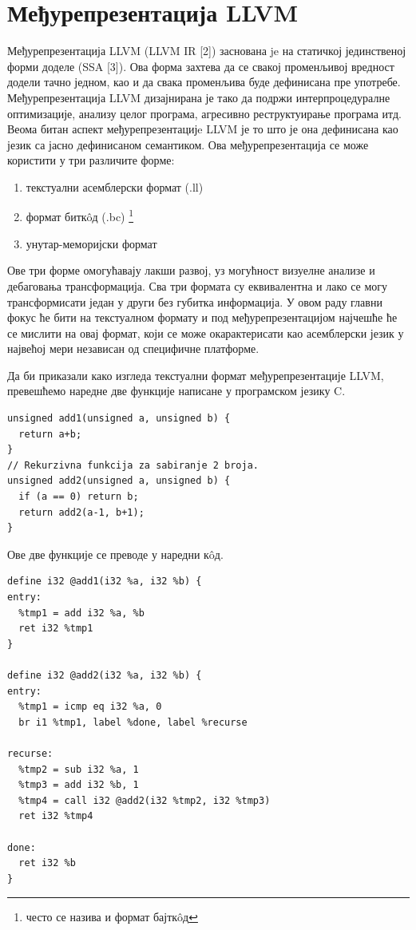 \documentclass[12pt,oneside]{memoir}
\begin{document}
\section{Међурепрезентација LLVM}
Међурепрезентација LLVM (LLVM IR [2]) заснована je на статичкој 
јединственој форми доделе (SSA [3]).
Ова форма захтева да се свакој променљивој вредност додели тачно једном, као и да
свака променљива буде дефинисана пре употребе.
Међурепрезентација LLVM дизајнирана је тако да подржи интерпроцедуралне оптимизације,
анализу целог програма, агресивно реструктуирање програма итд.
Веома битан аспект међурепрезентацијe LLVM је то што је она дефинисана као 
језик са јасно дефинисаном семантиком.
Ова међурепрезентација се може користити у три различите форме: 
\begin{enumerate}
\item текстуални асемблерски формат (.ll)
\item формат битк\^{o}д (.bc) \footnote{често се назива и формат бајтк\^{o}д}
\item унутар-меморијски формат 
\end{enumerate} 
Ове три форме омогућавају лакши развој, уз могућност
визуелне анализе и дебаговања трансформација. 
Сва три формата су еквивалентна и лако се могу трансформисати један у други без
губитка информација. 
У овом раду главни фокус ће бити на текстуалном формату и под међурепрезентацијом
 најчешће ће се мислити на овај формат, који се може окарактерисати као асемблерски 
језик у највећој мери независан од специфичне платформе.

Да би приказали како изгледа текстуални формат међурепрезентације LLVM,
превешћемо наредне две функције написане у програмском језику C.
\begin{lstlisting}[frame=single]
unsigned add1(unsigned a, unsigned b) {
  return a+b;
}
// Rekurzivna funkcija za sabiranje 2 broja.
unsigned add2(unsigned a, unsigned b) {
  if (a == 0) return b;
  return add2(a-1, b+1);
}
\end{lstlisting}
\pagebreak
Ове две функције се преводе у наредни к\^{o}д.
\begin{lstlisting}[frame=single,caption={Kod preuzet sa članka  \textit{LLVM - The archicture of open source applications} [15]}, captionpos=b]
define i32 @add1(i32 %a, i32 %b) {
entry:
  %tmp1 = add i32 %a, %b
  ret i32 %tmp1
}

define i32 @add2(i32 %a, i32 %b) {
entry:
  %tmp1 = icmp eq i32 %a, 0
  br i1 %tmp1, label %done, label %recurse

recurse:
  %tmp2 = sub i32 %a, 1
  %tmp3 = add i32 %b, 1
  %tmp4 = call i32 @add2(i32 %tmp2, i32 %tmp3)
  ret i32 %tmp4

done:
  ret i32 %b
}
\end{lstlisting}
\end{document}

